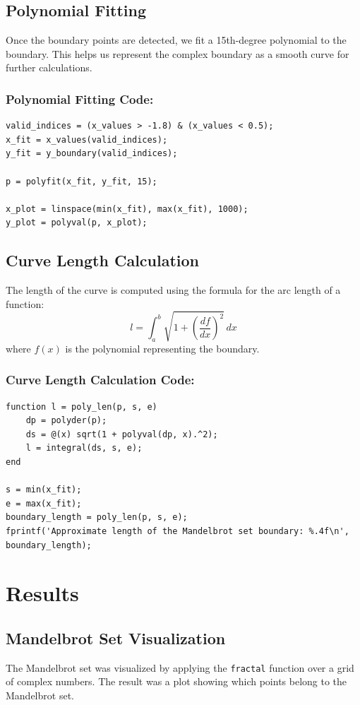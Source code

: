 \documentclass{article}
\begin{document}
\subsection{Polynomial Fitting}
Once the boundary points are detected, we fit a 15th-degree polynomial to the boundary. This helps us represent the complex boundary as a smooth curve for further calculations.

\subsubsection*{Polynomial Fitting Code:}
\begin{verbatim}
valid_indices = (x_values > -1.8) & (x_values < 0.5);
x_fit = x_values(valid_indices);
y_fit = y_boundary(valid_indices);

p = polyfit(x_fit, y_fit, 15);

x_plot = linspace(min(x_fit), max(x_fit), 1000);
y_plot = polyval(p, x_plot);
\end{verbatim}

\subsection{Curve Length Calculation}
The length of the curve is computed using the formula for the arc length of a function:
\[
l = \int_a^b \sqrt{1 + \left(\frac{df}{dx}\right)^2} \, dx
\]
where \( f(x) \) is the polynomial representing the boundary.

\subsubsection*{Curve Length Calculation Code:}
\begin{verbatim}
function l = poly_len(p, s, e)
    dp = polyder(p);
    ds = @(x) sqrt(1 + polyval(dp, x).^2);
    l = integral(ds, s, e);
end

s = min(x_fit);
e = max(x_fit);
boundary_length = poly_len(p, s, e);
fprintf('Approximate length of the Mandelbrot set boundary: %.4f\n', boundary_length);
\end{verbatim}

\section{Results}
\subsection{Mandelbrot Set Visualization}
The Mandelbrot set was visualized by applying the \texttt{fractal} function over a grid of complex numbers. The result was a plot showing which points belong to the Mandelbrot set.
\end{document}
